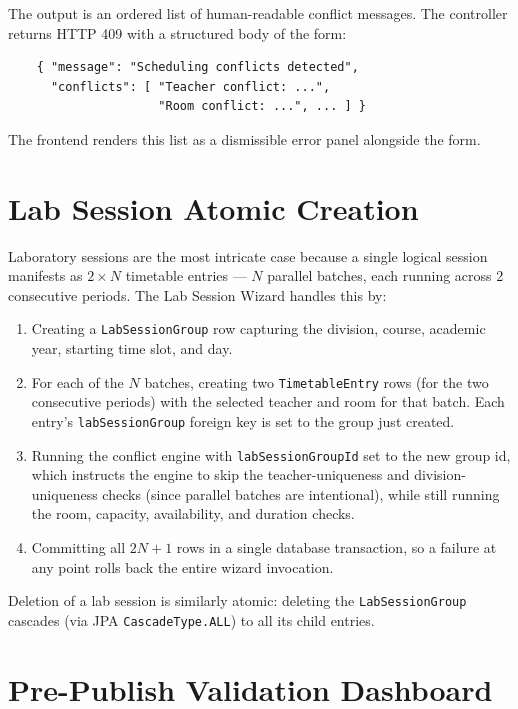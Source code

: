 The output is an ordered list of human-readable conflict messages. The controller returns HTTP 409 with a structured body of the form:
\begin{verbatim}
    { "message": "Scheduling conflicts detected",
      "conflicts": [ "Teacher conflict: ...",
                     "Room conflict: ...", ... ] }
\end{verbatim}
The frontend renders this list as a dismissible error panel alongside the form.

\section{Lab Session Atomic Creation}

Laboratory sessions are the most intricate case because a single logical session manifests as $2 \times N$ timetable entries --- $N$ parallel batches, each running across 2 consecutive periods. The Lab Session Wizard handles this by:

\begin{enumerate}
    \item Creating a \texttt{LabSessionGroup} row capturing the division, course, academic year, starting time slot, and day.
    \item For each of the $N$ batches, creating two \texttt{TimetableEntry} rows (for the two consecutive periods) with the selected teacher and room for that batch. Each entry's \texttt{labSessionGroup} foreign key is set to the group just created.
    \item Running the conflict engine with \texttt{labSessionGroupId} set to the new group id, which instructs the engine to skip the teacher-uniqueness and division-uniqueness checks (since parallel batches are intentional), while still running the room, capacity, availability, and duration checks.
    \item Committing all $2N + 1$ rows in a single database transaction, so a failure at any point rolls back the entire wizard invocation.
\end{enumerate}

Deletion of a lab session is similarly atomic: deleting the \texttt{LabSessionGroup} cascades (via JPA \texttt{CascadeType.ALL}) to all its child entries.

\section{Pre-Publish Validation Dashboard}

